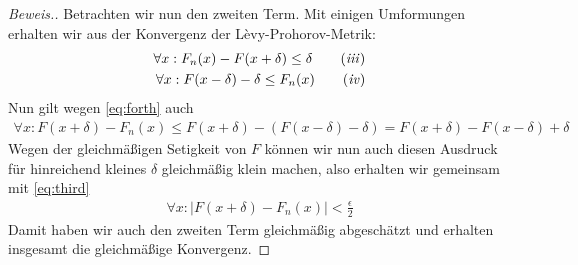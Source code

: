 \begin{proof}[Beweis.]
Betrachten wir nun den zweiten Term. Mit einigen Umformungen erhalten wir aus der Konvergenz der Lèvy-Prohorov-Metrik:
\begin{align*}
 \forall x: F_n(x)- F(x+\delta)\leq \delta \tag{\textit{iii}} \label{eq:third} \\
 \forall x: F(x-\delta)-\delta\leq F_n(x)\tag{\textit{iv}} \label{eq:forth} \\
\end{align*}
Nun gilt wegen \eqref{eq:forth} auch
\begin{align*}
  \forall x: F(x+\delta)-F_n(x)\leq F(x+\delta)-(F(x-\delta)-\delta)=F(x+\delta)-F(x-\delta)+\delta
\end{align*}
Wegen der gleichmäßigen Setigkeit von $F$ können wir nun auch diesen Ausdruck für hinreichend kleines $\delta$ gleichmäßig klein machen, also erhalten wir gemeinsam mit \eqref{eq:third}
\begin{align*}
  \forall x:\vert F(x+\delta)-F_n(x)\vert<\frac{\epsilon}{2}
\end{align*}
Damit haben wir auch den zweiten Term gleichmäßig abgeschätzt und erhalten insgesamt die gleichmäßige Konvergenz.
\end{proof}

